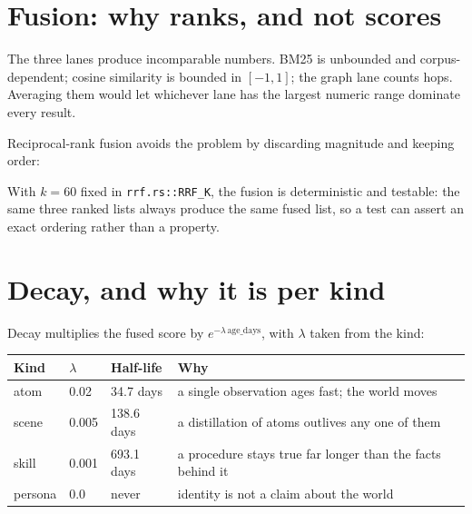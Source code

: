 \section{Fusion: why ranks, and not scores}

The three lanes produce incomparable numbers. BM25 is unbounded and corpus-dependent; cosine
similarity is bounded in $[-1,1]$; the graph lane counts hops. Averaging them would let whichever
lane has the largest numeric range dominate every result.

Reciprocal-rank fusion avoids the problem by discarding magnitude and keeping order:

\begin{center}
\end{center}

With $k=60$ fixed in \texttt{rrf.rs::RRF\_K}, the fusion is deterministic and testable: the same
three ranked lists always produce the same fused list, so a test can assert an exact ordering
rather than a property.

\section{Decay, and why it is per kind}

Decay multiplies the fused score by $e^{-\lambda\,\text{age\_days}}$, with $\lambda$ taken from the
kind:

\begin{longtable}{@{}p{}p{}p{}p{}@{}}
  \toprule
  \textbf{Kind} & \textbf{$\lambda$} & \textbf{Half-life} & \textbf{Why} \\
  \midrule
  \endhead
  atom & 0.02 & 34.7 days & a single observation ages fast; the world moves \\
  scene & 0.005 & 138.6 days & a distillation of atoms outlives any one of them \\
  skill & 0.001 & 693.1 days & a procedure stays true far longer than the facts behind it \\
  persona & 0.0 & never & identity is not a claim about the world \\
  \bottomrule
\end{longtable}

